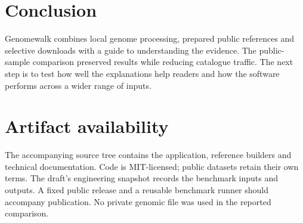 \documentclass[10pt,twocolumn,letterpaper]{article}
\begin{document}
\section{Conclusion}
Genomewalk combines local genome processing, prepared public references and selective downloads with a guide to understanding the evidence. The public-sample comparison preserved results while reducing catalogue traffic. The next step is to test how well the explanations help readers and how the software performs across a wider range of inputs.

\section*{Artifact availability}
The accompanying source tree contains the application, reference builders and technical documentation. Code is MIT-licensed; public datasets retain their own terms. The draft's engineering snapshot records the benchmark inputs and outputs. A fixed public release and a reusable benchmark runner should accompany publication. No private genomic file was used in the reported comparison.
\end{document}
